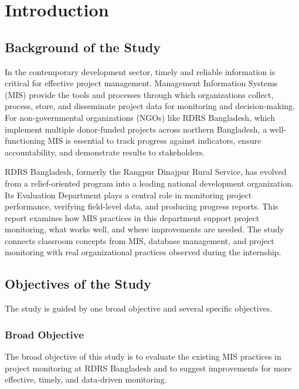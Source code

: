\documentclass[12pt,a4paper]{report}
\begin{document}

\chapter{Introduction}

\section{Background of the Study}
In the contemporary development sector, timely and reliable information is
critical for effective project management. Management Information Systems
(MIS) provide the tools and processes through which organizations
collect, process, store, and disseminate project data for monitoring and
decision-making. For non-governmental organizations (NGOs) like RDRS
Bangladesh, which implement multiple donor-funded projects across
northern Bangladesh, a well-functioning MIS is essential to track
progress against indicators, ensure accountability, and demonstrate
results to stakeholders.

RDRS Bangladesh, formerly the Rangpur Dinajpur Rural Service, has evolved
from a relief-oriented program into a leading national development
organization. Its Evaluation Department plays a central role in
monitoring project performance, verifying field-level data, and
producing progress reports. This report examines how MIS practices in
this department support project monitoring, what works well, and where
improvements are needed. The study connects classroom concepts from MIS,
database management, and project monitoring with real organizational
practices observed during the internship.

\section{Objectives of the Study}
The study is guided by one broad objective and several specific
objectives.

\subsection{Broad Objective}
The broad objective of this study is to evaluate the existing MIS
practices in project monitoring at RDRS Bangladesh and to suggest
improvements for more effective, timely, and data-driven monitoring.
\end{document}
